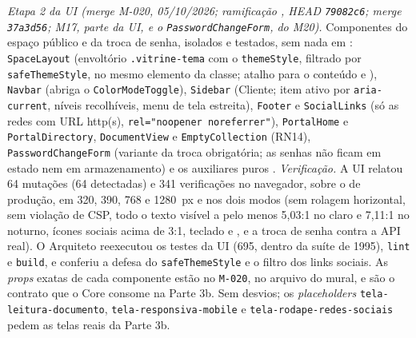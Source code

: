 \emph{Etapa 2 da UI (merge M-020, 05/10/2026; ramificação , HEAD \texttt{79082c6}; merge \texttt{37a3d56}; M17, parte da UI, e o \texttt{PasswordChangeForm}, do M20).} Componentes do espaço público e da troca de senha, isolados e testados, sem nada em : \texttt{SpaceLayout} (envoltório \texttt{.vitrine-tema} com o \texttt{themeStyle}, filtrado por \texttt{safeThemeStyle}, no mesmo elemento da classe; atalho para o conteúdo e ), \texttt{Navbar} (abriga o \texttt{ColorModeToggle}), \texttt{Sidebar} (Cliente; item ativo por \texttt{aria-current}, níveis recolhíveis, menu de tela estreita), \texttt{Footer} e \texttt{SocialLinks} (só as redes com URL http(s), \texttt{rel="noopener noreferrer"}), \texttt{PortalHome} e \texttt{PortalDirectory}, \texttt{DocumentView} e \texttt{EmptyCollection} (RN14), \texttt{PasswordChangeForm} (variante da troca obrigatória; as senhas não ficam em estado nem em armazenamento) e os auxiliares puros . \emph{Verificação.} A UI relatou 64 mutações (64 detectadas) e 341 verificações no navegador, sobre o  de produção, em 320, 390, 768 e 1280~px e nos dois modos (sem rolagem horizontal, sem violação de CSP, todo o texto visível a pelo menos 5,03:1 no claro e 7,11:1 no noturno, ícones sociais acima de 3:1, teclado e , e a troca de senha contra a API real). O Arquiteto reexecutou os testes da UI (695, dentro da suíte de 1995), \texttt{lint} e \texttt{build}, e conferiu a defesa do \texttt{safeThemeStyle} e o filtro dos links sociais. As \emph{props} exatas de cada componente estão no \texttt{M-020}, no arquivo do mural, e são o contrato que o Core consome na Parte 3b. Sem desvios; os \emph{placeholders} \texttt{tela-leitura-documento}, \texttt{tela-responsiva-mobile} e \texttt{tela-rodape-redes-sociais} pedem as telas reais da Parte 3b.

